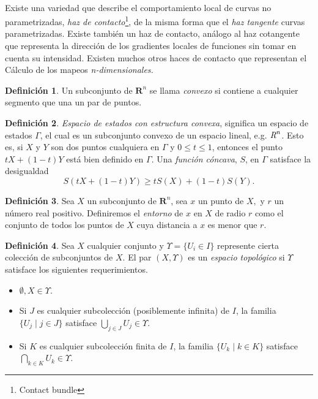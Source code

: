 \documentclass{article}
\theoremstyle{definition} \newtheorem{defi}{Definici\'on}
\theoremstyle{definition} \newtheorem{teo}{Teorema}
\theoremstyle{definition} \newtheorem{cor}{Corolario}
\begin{document}
\paragraph{}
Existe una variedad que describe el comportamiento local de curvas no parametrizadas, \emph{haz de contacto}\footnote{Contact bundle}, de la misma forma que el \emph{haz tangente} curvas parametrizadas. Existe tambi\'en un haz de contacto, an\'alogo al haz cotangente que representa la direcci\'on de los gradientes locales de funciones sin tomar en cuenta su intensidad. Existen muchos otros haces de contacto que representan el C\'alculo de los mapeos \emph{n-dimensionales.}
\begin{defi}
Un subconjunto de $\mathbf{R}^n$ se llama \emph{convexo} si contiene a cualquier segmento que una un par de puntos.
\end{defi}
\begin{defi}
\emph{Espacio de estados con estructura convexa}, significa un espacio de estados $\Gamma$, el cual es un subconjunto convexo de un espacio lineal, e.g. $\emph{R}^n$. Esto es, si $X$ y $Y$ son dos puntos cualquiera en $\Gamma$ y $0 \leq t \leq 1$, entonces el punto $tX+(1-t)Y$ est\'a bien definido en $\Gamma$. Una \emph{funci\'on c\'oncava}, $S$, en $\Gamma$ satisface la desigualdad
$$S(tX+(1-t)Y)\geq tS(X)+(1-t)S(Y).$$
\end{defi}
\begin{defi}
Sea $X$ un subconjunto de $\mathbf{R}^n$, sea $x$ un punto de $X,$ y $r$ un n\'umero real positivo. Definiremos el \emph{entorno} de $x$ en $X$ de radio $r$ como el conjunto de todos los puntos de $X$ cuya distancia a $x$ es menor que $r$.
\end{defi}
\begin{defi}
Sea $X$ cualquier conjunto y $\Upsilon=\{U_i \in I\}$ represente cierta colecci\'on de subconjuntos de $X$. El par $(X,\Upsilon)$ es un \emph{espacio topol\'ogico} si $\Upsilon$ satisface los siguientes requerimientos.
\begin{itemize}
\item $\emptyset, X \in \Upsilon$.
\item Si $J$ es cualquier subcolecci\'on (posiblemente infinita) de $I$, la familia $\{U_j \mid j \in J\}$ satisface $\bigcup_{j \in J}U_j \in \Upsilon$.
\item Si $K$ es cualquier subcolecci\'on finita de $I$, la familia $\{U_k \mid k \in K\}$ satisface $\bigcap_{k \in K}U_k \in \Upsilon$.
\end{itemize}
\end{defi}
\end{document}
